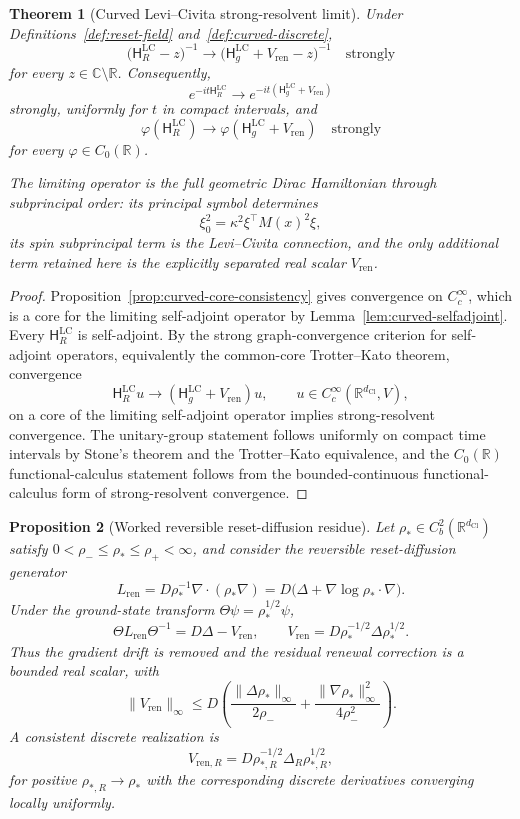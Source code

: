 \documentclass[11pt]{article}
\newtheorem{theorem}{Theorem}[section]
\newtheorem{proposition}[theorem]{Proposition}
\theoremstyle{definition}
\theoremstyle{remark}
\newcommand{\R}{\mathbb{R}}
\newcommand{\C}{\mathbb{C}}
\newcommand{\dCl}{d_{\mathrm{Cl}}}
\newcommand{\Ham}{\mathsf{H}}
\begin{document}
\begin{theorem}[Curved Levi--Civita strong-resolvent limit]
\label{thm:curved-limit}
Under Definitions~\ref{def:reset-field} and~\ref{def:curved-discrete},
\[
  \bigl(\Ham_R^{\mathrm{LC}}-z\bigr)^{-1}
  \longrightarrow
  \bigl(\Ham_g^{\mathrm{LC}}+V_{\mathrm{ren}}-z\bigr)^{-1}
  \quad\text{strongly}
\]
for every \(z\in\C\setminus\R\).  Consequently,
\[
  e^{-it\Ham_R^{\mathrm{LC}}}
  \longrightarrow
  e^{-it(\Ham_g^{\mathrm{LC}}+V_{\mathrm{ren}})}
\]
strongly, uniformly for \(t\) in compact intervals, and
\[
  \varphi(\Ham_R^{\mathrm{LC}})
  \longrightarrow
  \varphi(\Ham_g^{\mathrm{LC}}+V_{\mathrm{ren}})
  \quad\text{strongly}
\]
for every \(\varphi\in C_0(\R)\).

The limiting operator is the full geometric Dirac Hamiltonian through
subprincipal order: its principal symbol determines
\[
  \xi_0^2=\kappa^2\xi^\top M(x)^2\xi ,
\]
its spin subprincipal term is the Levi--Civita connection, and the only
additional term retained here is the explicitly separated real scalar
\(V_{\mathrm{ren}}\).
\end{theorem}

\begin{proof}
Proposition~\ref{prop:curved-core-consistency} gives convergence on
\(C_c^\infty\), which is a core for the limiting self-adjoint operator by
Lemma~\ref{lem:curved-selfadjoint}.  Every
\(\Ham_R^{\mathrm{LC}}\) is self-adjoint.  By the strong graph-convergence
criterion for self-adjoint operators, equivalently the common-core
Trotter--Kato theorem, convergence
\[
  \Ham_R^{\mathrm{LC}}u\longrightarrow
  (\Ham_g^{\mathrm{LC}}+V_{\mathrm{ren}})u,
  \qquad u\in C_c^\infty(\R^{\dCl},V),
\]
on a core of the limiting self-adjoint operator implies strong-resolvent
convergence.  The unitary-group statement follows uniformly on compact time
intervals by Stone's theorem and the Trotter--Kato equivalence, and the
\(C_0(\R)\) functional-calculus statement follows from the bounded-continuous
functional-calculus form of strong-resolvent convergence.
\end{proof}

\begin{proposition}[Worked reversible reset-diffusion residue]
\label{prop:renewal-scalar-potential}
Let \(\rho_*\in C_b^2(\R^{\dCl})\) satisfy
\(0<\rho_-\le\rho_*\le\rho_+<\infty\), and consider the reversible reset-diffusion
generator
\[
  L_{\mathrm{ren}}
  =D\rho_*^{-1}\nabla\!\cdot(\rho_*\nabla)
  =D\bigl(\Delta+\nabla\log\rho_*\cdot\nabla\bigr).
\]
Under the ground-state transform
\(\Theta\psi=\rho_*^{1/2}\psi\),
\[
  \Theta L_{\mathrm{ren}}\Theta^{-1}
  =D\Delta-V_{\mathrm{ren}},
  \qquad
  V_{\mathrm{ren}}
  =D\rho_*^{-1/2}\Delta\rho_*^{1/2}.
\]
Thus the gradient drift is removed and the residual renewal correction is a
bounded real scalar, with
\[
  \|V_{\mathrm{ren}}\|_\infty
  \le D\left(
    \frac{\|\Delta\rho_*\|_\infty}{2\rho_-}
    +
    \frac{\|\nabla\rho_*\|_\infty^2}{4\rho_-^2}
  \right).
\]
A consistent discrete realization is
\[
  V_{\mathrm{ren},R}
  =D\rho_{*,R}^{-1/2}\Delta_R\rho_{*,R}^{1/2},
\]
for positive \(\rho_{*,R}\to\rho_*\) with the corresponding discrete
derivatives converging locally uniformly.
\end{proposition}
\end{document}
